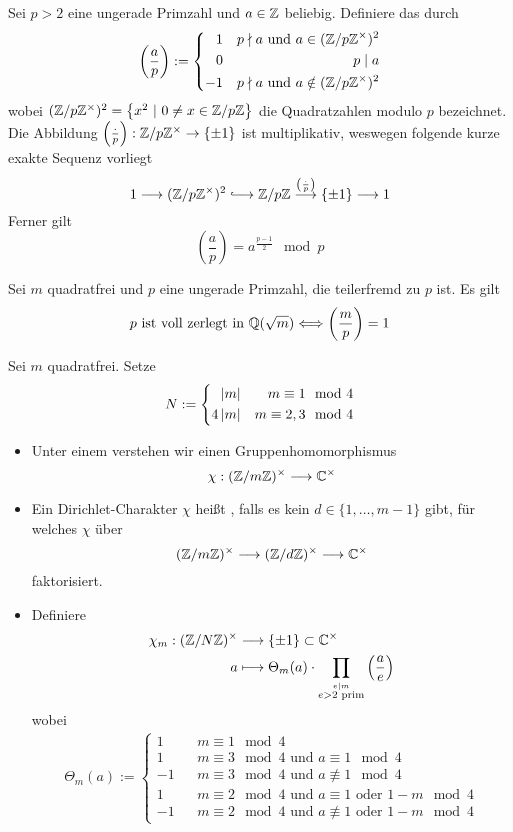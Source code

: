 \documentclass{book}
\newcommand{\Leg}[2]{\left(\frac{#1}{#2}\right)}
\begin{document}
Sei $p> 2$ eine ungerade Primzahl und $a \in \mathbb{Z}$ beliebig. Definiere das  durch
\[ \Leg{a}{p} := \left\lbrace 
\begin{aligned}
1 && p \nmid a \text{ und } a \in (\Z/p\Z^\times)^2\\
0 && p \mid a\\
-1 && p \nmid a \text{ und } a \notin (\Z/p\Z^\times)^2
\end{aligned}
\right. \]
wobei $(\Z/p\Z^\times)^2 = \set{x^2}{0\neq x \in \Z/p\Z}$ die Quadratzahlen modulo $p$ bezeichnet.\\
Die Abbildung $\Leg{\cdot}{p} : \Z/p\Z^\times \pfeil{} \{\pm 1\}$ ist multiplikativ, weswegen folgende kurze exakte Sequenz vorliegt
\[ 1 \Pfeil{} (\Z/p\Z^\times)^2 \Inj{} \Z/p\Z \Pfeil{\Leg{\cdot}{p}} \{\pm 1\} \Pfeil{} 1  \]
Ferner gilt
\[ \Leg{a}{p} = a^{\frac{p-1}{2}} \mod{p} \]

Sei $m$ quadratfrei und $p$ eine ungerade Primzahl, die teilerfremd zu $p$ ist. Es gilt
\[ p\text{ ist voll zerlegt in }\Q(\sqrt{m}) \Gdw{} \Leg{m}{p} = 1 \]

Sei $m$ quadratfrei. Setze
\begin{align*}
N := 
\left\lbrace\begin{aligned}
\left|m\right| && m \equiv 1 \mod{4}\\
4\left|m\right| && m \equiv 2,3 \mod{4}
\end{aligned}\right.
\end{align*}
\begin{itemize}
\item Unter einem  verstehen wir einen Gruppenhomomorphismus
\[ \chi : (\mathbb{Z} / m\mathbb{Z})^\times \overset{}{\longrightarrow} \mathbb{C}^\times \]
\item Ein Dirichlet-Charakter $\chi$ heißt , falls es kein $d \in \{1,\ldots, m-1\}$ gibt, für welches $\chi$ über
\[ (\mathbb{Z} / m\mathbb{Z})^\times \overset{}{\longrightarrow}(\mathbb{Z} / d\mathbb{Z})^\times \overset{}{\longrightarrow} \mathbb{C}^\times \]
faktorisiert.
\item Definiere
\begin{align*}
\chi_m : (\Z /N\Z)^\times  & \Pfeil{} \{\pm 1\} \subset \C^\times\\
a & \longmapsto \Theta_m(a) \cdot \prod_{\stackrel{e|m}{e > 2 \text{ prim}}}\Leg{a}{e} 
\end{align*}
wobei
\begin{align*}
\Theta_m(a) := \left\lbrace
\begin{aligned}
1 && m \equiv 1 \mod{4}\\
1 && m \equiv 3 \mod{4} \text{ und } a \equiv 1 \mod{4}\\
-1 && m \equiv 3 \mod{4} \text{ und } a \not\equiv 1 \mod{4}\\
1 && m \equiv 2 \mod{4} \text{ und } a \equiv 1 \text{ oder } 1 - m \mod{4}\\
-1 && m \equiv 2 \mod{4} \text{ und } a \not\equiv 1 \text{ oder } 1 - m \mod{4}
\end{aligned}
\right.
\end{align*}
\end{itemize}
\end{document}
